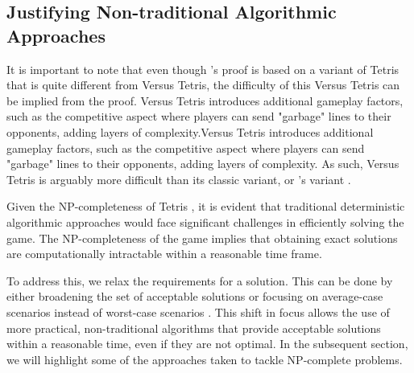 \documentclass[a4paper, 12pt]{extreport}
\begin{document}
			\subsection{Justifying Non-traditional Algorithmic Approaches}
			
				
				It is important to note that even though \citeauthor{tetris-is-hard-even-to-approx}'s \cite{tetris-is-hard-even-to-approx} proof is based on a variant of Tetris that is quite different from Versus Tetris, the difficulty of this Versus Tetris can be implied from the proof. Versus Tetris introduces additional gameplay factors, such as the competitive aspect where players can send "garbage" lines to their opponents, adding layers of complexity.Versus Tetris introduces additional gameplay factors, such as the competitive aspect where players can send "garbage" lines to their opponents, adding layers of complexity. As such, Versus Tetris is arguably more difficult than its classic variant, or \citeauthor{tetris-is-hard-even-to-approx}'s variant \cite{tetris-is-hard-even-to-approx}.
				
				Given the NP-completeness of Tetris \cite{tetris-is-hard-even-to-approx} \cite{tetris-o1-np-hard}, it is evident that traditional deterministic algorithmic approaches would face significant challenges in efficiently solving the game. The NP-completeness of the game implies that obtaining exact solutions are computationally intractable within a reasonable time frame.
				
				To address this, we relax the requirements for a solution. This can be done by either broadening the set of acceptable solutions or focusing on average-case scenarios instead of worst-case scenarios \cite{cc:conceptual-perspective}. This shift in focus allows the use of more practical, non-traditional algorithms that provide acceptable solutions within a reasonable time, even if they are not optimal. In the subsequent section, we will highlight some of the approaches taken to tackle NP-complete problems.
							
\end{document}

